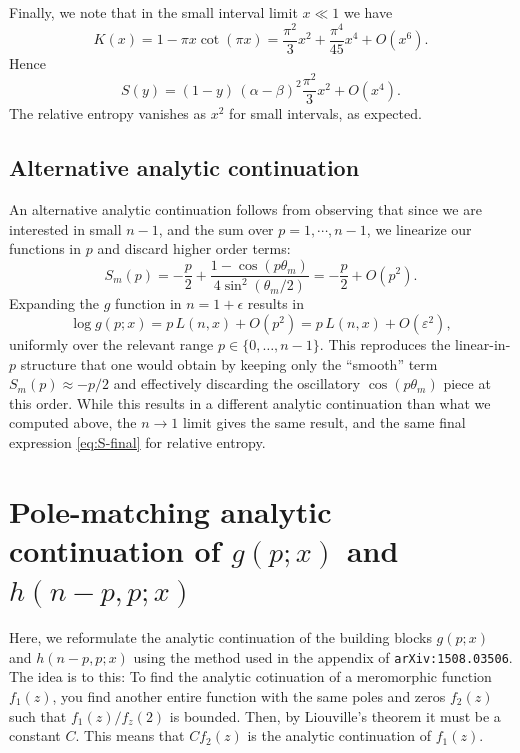 \documentclass[11pt]{article}
\newcommand{\eps}{\varepsilon}
\begin{document}
{  Finally, we note that in the small interval limit $x\ll 1$ we have
  \begin{equation}
    K(x)=1-\pi x\cot(\pi x)=\frac{\pi^{2}}{3}x^{2}+\frac{\pi^{4}}{45}x^{4}+O(x^{6}
    ).
  \end{equation}
  Hence
  \begin{equation}
    S(y)= (1-y)\,(\alpha-\beta)^{2}\frac{\pi^{2}}{3}x^{2}+O(x^{4}).
  \end{equation}
  The relative entropy vanishes as $x^{2}$ for small intervals, as expected.

  \subsection*{Alternative analytic continuation}
  \label{sec:small-n1} An alternative analytic continuation follows from observing
  that since we are interested in small $n-1$, and the sum over
  $p=1,\cdots , n-1$, we linearize our functions in $p$ and discard higher order
  terms:
  \begin{equation}
    S_{m}(p)= -\frac{p}{2}+\frac{1-\cos(p\theta_{m})}{4\sin^{2}(\theta_{m}/2)}= -
    \frac{p}{2}+O(p^{2}). \label{eq:Sm-smallp}
  \end{equation}
  Expanding the $g$ function in $n=1+\epsilon$ results in
  \begin{equation}
    \log g(p;x)=p\,L(n,x)+O(p^{2})=p\,L(n,x)+O(\eps^{2}),
  \end{equation}
  uniformly over the relevant range $p\in\{0,\dots,n-1\}$. This reproduces the linear-in-$p$
  structure that one would obtain by keeping only the ``smooth'' term $S_{m}(p)\approx
  -p/2$ and effectively discarding the oscillatory $\cos(p\theta_{m})$ piece at this
  order. While this results in a different analytic continuation than what we
  computed above, the $n\to 1$ limit gives the same result, and the same final
  expression \eqref{eq:S-final} for relative entropy.


  \section*{Pole-matching analytic continuation of $g(p;x)$ and $h(n-p,p;x)$}

  Here, we reformulate the analytic continuation of the building blocks $g(p;x)$
  and $h(n-p,p;x)$ using the method used in the appendix of \texttt{arXiv:1508.03506}.
  The idea is to this: To find the analytic cotinuation of a meromorphic function
  $f_{1}(z)$, you find another entire function with the same poles and zeros
  $f_{2}(z)$ such that $f_{1}(z)/f_{z}(2)$ is bounded. Then, by Liouville's
  theorem it must be a constant $C$. This means that $C f_{2}(z)$ is the analytic
  continuation of $f_{1}(z)$.

}
\end{document}
